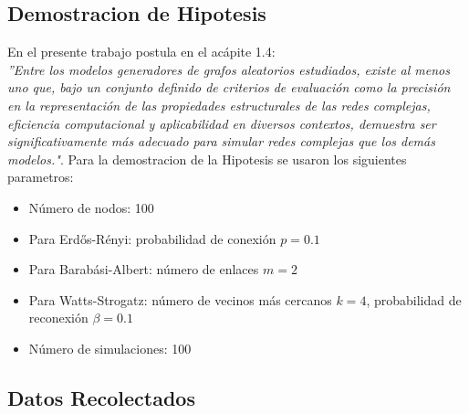 \documentclass[12pt]{book}
\begin{document}
\subsection{Demostracion de Hipotesis}
En el presente trabajo postula en el acápite 1.4:\\
\textit{''Entre los modelos generadores de grafos aleatorios estudiados, existe al menos uno que, bajo un conjunto definido de criterios de evaluación como la precisión en la representación de las propiedades estructurales de las redes complejas, eficiencia computacional y aplicabilidad en diversos contextos, demuestra ser significativamente más adecuado para simular redes complejas que los demás modelos."}.
Para la demostracion de la Hipotesis se usaron los siguientes parametros:
\begin{itemize}
    \item Número de nodos: 100
    \item Para Erdős-Rényi: probabilidad de conexión \(p = 0.1\)
    \item Para Barabási-Albert: número de enlaces \(m = 2\)
    \item Para Watts-Strogatz: número de vecinos más cercanos \(k = 4\), probabilidad de reconexión \(\beta = 0.1\)
    \item Número de simulaciones: 100
\end{itemize}

\subsection{Datos Recolectados}
\end{document}

